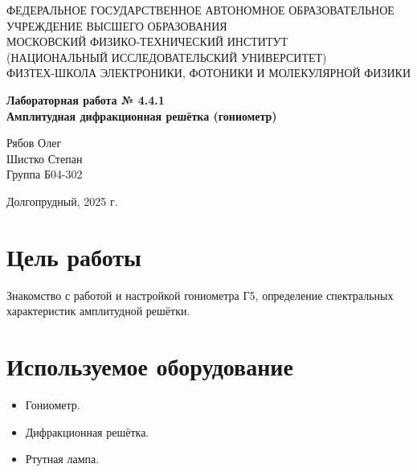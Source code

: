 \documentclass[a4paper, 12pt]{article}
\begin{document}
\begin{center}
  \footnotesize{ФЕДЕРАЛЬНОЕ ГОСУДАРСТВЕННОЕ АВТОНОМНОЕ ОБРАЗОВАТЕЛЬНОЕ УЧРЕЖДЕНИЕ ВЫСШЕГО ОБРАЗОВАНИЯ}\\
  \footnotesize{МОСКОВСКИЙ ФИЗИКО-ТЕХНИЧЕСКИЙ ИНСТИТУТ\\(НАЦИОНАЛЬНЫЙ ИССЛЕДОВАТЕЛЬСКИЙ УНИВЕРСИТЕТ)}\\
  \footnotesize{ФИЗТЕХ-ШКОЛА ЭЛЕКТРОНИКИ, ФОТОНИКИ И МОЛЕКУЛЯРНОЙ ФИЗИКИ}\\
  \vspace{2cm} %
\end{center}

\thispagestyle{empty} %

\begin{center}
    \vspace*{\fill} %
    {\Huge \textbf{Лабораторная работа № 4.4.1}} \\[0.5cm]
    {\LARGE \textbf{Амплитудная дифракционная решётка (гониометр)}} %
    \vspace*{\fill} %
\end{center}

\vspace{1cm} %
\begin{flushright}
    Рябов Олег \\
    Шистко Степан \\
    Группа Б04-302
\end{flushright}

\vfill
\begin{center}
  Долгопрудный, 2025 г.
\end{center}
\newpage

\section*{Цель работы}
Знакомство с работой и настройкой гониометра Г5, определение спектральных характеристик амплитудной решётки.

\section*{Используемое оборудование}
\begin{itemize}
    \item Гониометр.
    \item Дифракционная решётка.
    \item Ртутная лампа.
\end{itemize}
\end{document}
